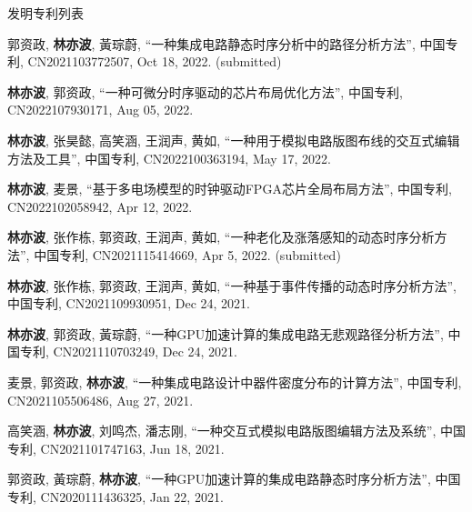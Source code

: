 \begin{rSection}{发明专利列表}
\begin{description}[font=\normalfont, rightmargin=2em]
\item[{[P10]}]{
        郭资政, \textbf{林亦波}, 黃琮蔚, 
    ``一种集成电路静态时序分析中的路径分析方法'', 
    中国专利, CN2021103772507, Oct 18, 2022.
    (submitted)
}
            

\item[{[P9]}]{
        \textbf{林亦波}, 郭资政, 
    ``一种可微分时序驱动的芯片布局优化方法'', 
    中国专利, CN2022107930171, Aug 05, 2022.
    
}
            

\item[{[P8]}]{
        \textbf{林亦波}, 张昊懿, 高笑涵, 王润声, 黄如, 
    ``一种用于模拟电路版图布线的交互式编辑方法及工具'', 
    中国专利, CN2022100363194, May 17, 2022.
    
}
            

\item[{[P7]}]{
        \textbf{林亦波}, 麦景, 
    ``基于多电场模型的时钟驱动FPGA芯片全局布局方法'', 
    中国专利, CN2022102058942, Apr 12, 2022.
    
}
            

\item[{[P6]}]{
        \textbf{林亦波}, 张作栋, 郭资政, 王润声, 黄如, 
    ``一种老化及涨落感知的动态时序分析方法'', 
    中国专利, CN2021115414669, Apr 5, 2022.
    (submitted)
}
            

\item[{[P5]}]{
        \textbf{林亦波}, 张作栋, 郭资政, 王润声, 黄如, 
    ``一种基于事件传播的动态时序分析方法'', 
    中国专利, CN2021109930951, Dec 24, 2021.
    
}
            

\item[{[P4]}]{
        \textbf{林亦波}, 郭资政, 黃琮蔚, 
    ``一种GPU加速计算的集成电路无悲观路径分析方法'', 
    中国专利, CN2021110703249, Dec 24, 2021.
    
}
            

\item[{[P3]}]{
        麦景, 郭资政, \textbf{林亦波}, 
    ``一种集成电路设计中器件密度分布的计算方法'', 
    中国专利, CN2021105506486, Aug 27, 2021.
    
}
            

\item[{[P2]}]{
        高笑涵, \textbf{林亦波}, 刘鸣杰, 潘志刚, 
    ``一种交互式模拟电路版图编辑方法及系统'', 
    中国专利, CN2021101747163, Jun 18, 2021.
    
}
            

\item[{[P1]}]{
        郭资政, 黃琮蔚, \textbf{林亦波}, 
    ``一种GPU加速计算的集成电路静态时序分析方法'', 
    中国专利, CN2020111436325, Jan 22, 2021.
    
}
            

\end{description}
    

\end{rSection}


